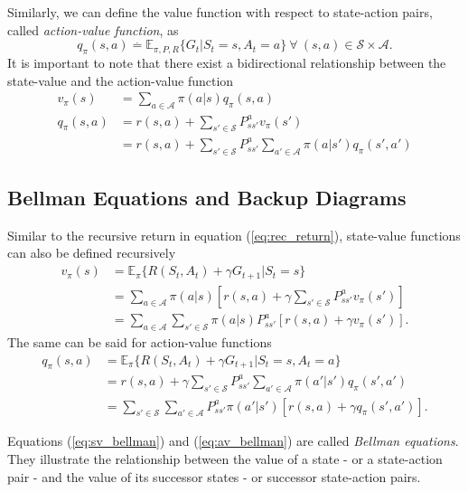 Similarly, we can define the value function with respect to state-action pairs, called \textit{action-value function}, as
\begin{equation}
\label{eq:av_func}
q_\pi(s,a) \overset{.}{=} \mathbb{E}_{\pi, P, R} \{ G_t | S_t = s, A_t = a\} 
	\ \forall \ (s,a) \in \mathcal{S} \times \mathcal{A}.
\end{equation}
It is important to note that there exist a bidirectional relationship between the state-value and the action-value function
\begin{align*}
v_\pi(s) &= \sum_{a \in \mathcal{A}} \pi(a|s) q_\pi(s,a) \\
q_\pi(s,a) &= r(s,a) + \sum_{s' \in \mathcal{S}} P^a_{ss'} v_\pi(s') \\
            &= r(s,a) + \sum_{s' \in \mathcal{S}} P^a_{ss'} \sum_{a' \in \mathcal{A}}
            \pi(a|s') q_\pi(s', a')
\end{align*}

\subsection{Bellman Equations and Backup Diagrams}
\label{subsec:backup_diagrams}

Similar to the recursive return in equation (\ref{eq:rec_return}), state-value functions can also be defined recursively
\begin{align}
\label{eq:sv_bellman}
v_\pi(s) &= \mathbb{E}_\pi\{ R(S_t, A_t) + \gamma G_{t+1} | S_t = s \} \nonumber \\
%
&= \sum_{a \in \mathcal{A}} \pi(a|s) [ r(s,a) + \gamma \sum_{s' \in \mathcal{S}} P^a_{ss'} v_\pi(s') ] 
	\nonumber \\
%
&= \sum_{a \in \mathcal{A}} \sum_{s' \in \mathcal{S}} \pi(a|s) P^a_{ss'} [ r(s,a) 
	+ \gamma v_\pi(s')].
\end{align}
The same can be said for action-value functions
\begin{align}
\label{eq:av_bellman}
q_\pi(s,a) &= \mathbb{E}_\pi \{ R(S_t, A_t) + \gamma G_{t+1} | S_t = s, A_t = a \} \nonumber \\
%
&= r(s,a) + \gamma \sum_{s' \in \mathcal{S}} P^a_{ss'} \sum_{a' \in \mathcal{A}} \pi(a'|s') q_\pi(s',a')
	\nonumber \\
%
&= \sum_{s' \in \mathcal{S}} \sum_{a' \in \mathcal{A}} P^a_{ss'} \pi(a'|s') [r(s,a) + \gamma q_\pi(s',a')].
\end{align}

Equations (\ref{eq:sv_bellman}) and (\ref{eq:av_bellman}) are called \textit{Bellman equations}.
They illustrate the relationship between the value of a state - or a state-action pair - and the value of its successor states - or successor state-action pairs.

